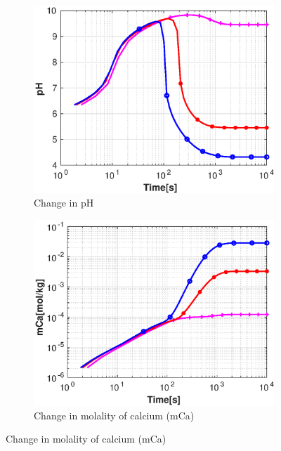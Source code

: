 \begin{figure}[!h]
        \centering
    \begin{subfigure}{.5\linewidth}
            \centering
        \includegraphics[width=\textwidth]{PICTURES/with_CO2_pH.eps}
        \caption{Change in pH}
        \label{fig:CO2pH}
    \end{subfigure}%
        \hfill
    \begin{subfigure}{.5\linewidth}
            \centering
        \includegraphics[width=\textwidth]{PICTURES/with_CO2_mCa.eps}
        \caption{Change in molality of calcium (mCa)}
        \label{fig:CO2mCa}
    \end{subfigure}%

\end{figure}
